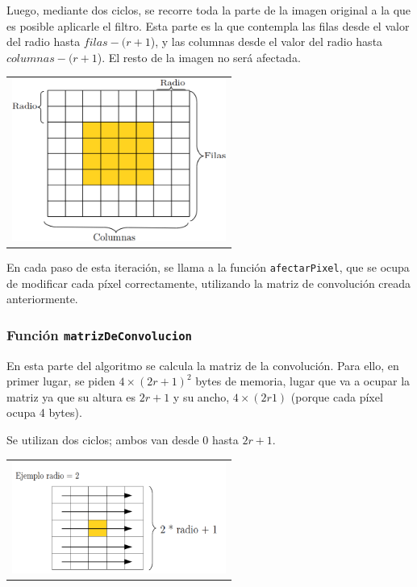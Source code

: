       Luego, mediante dos ciclos, se recorre toda la parte de la imagen original a la que es posible aplicarle el filtro. Esta parte es la que contempla las filas desde el valor del radio hasta $filas - (r + 1$), y las columnas desde el valor del radio hasta $columnas - (r + 1$). El resto de la imagen no será afectada. 

        {\centering \begin{tabular}{c}
          \includegraphics[width=7cm]{./imagenes/1.png} \\
        \end{tabular}}

      En cada paso de esta iteración, se llama a la función \texttt{afectarPixel}, que se ocupa de modificar cada píxel correctamente, utilizando la matriz de convolución creada anteriormente. 

      \subsubsection*{Función \texttt{matrizDeConvolucion}}

        En esta parte del algoritmo se calcula la matriz de la convolución. Para ello, en primer lugar, se piden $4 \times (2r + 1)^2$ bytes de memoria, lugar que va a ocupar la matriz ya que su altura es $2r + 1$ y su ancho, $4 \times (2r 1)$ (porque cada píxel ocupa 4 bytes).
        
        Se utilizan dos ciclos; ambos van desde 0 hasta $2r + 1$. 
        
        {\centering \begin{tabular}{c}
          \includegraphics[width=7cm]{./imagenes/2.png} \\
        \end{tabular}}

